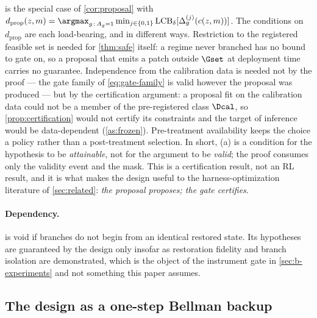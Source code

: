  is the special case of \cref{cor:proposal} with
$d_{\mathrm{prop}}(z,m)=\argmax_{g\,:\,A_g=1}\min_{j\in\{0,1\}}
\mathrm{LCB}_\delta[\Delta^{(j)}_g(c(z,m))]$.  The conditions on
$d_{\mathrm{prop}}$ are each load-bearing, and in different ways.  Restriction
to the registered feasible set is needed for \cref{thm:safe} itself: a regime
never branched has no bound to gate on, so a proposal that emits a patch outside
$\Gset$ at deployment time carries no guarantee.  Independence from the
calibration data is needed not by the proof --- the gate family of
\cref{eq:gate-family} is valid however the proposal was produced --- but by the
certification argument: a proposal fit on the calibration data could not be a
member of the pre-registered class $\Dcal$, so \cref{prop:certification} would
not certify its constraints and the target of inference would be data-dependent
(\cref{as:frozen}).  Pre-treatment availability keeps the choice a policy rather
than a post-treatment selection.  In short, (a) is a condition for the hypothesis
to be \emph{attainable}, not for the argument to be \emph{valid}; the proof
consumes only the validity event and the mask.  This is a certification result,
not an RL result, and it is what makes the design useful to the
harness-optimization literature of \cref{sec:related}: \emph{the proposal
proposes; the gate certifies}.

\paragraph{Dependency.}   is void if branches do not begin from
an identical restored state.  Its hypotheses are guaranteed by the design only
insofar as restoration fidelity and branch isolation are demonstrated, which is
the object of the instrument gate in \cref{sec:b-experiments} and not something this
paper assumes.

\subsection{The design as a one-step Bellman backup}
\label{sec:bellman}

